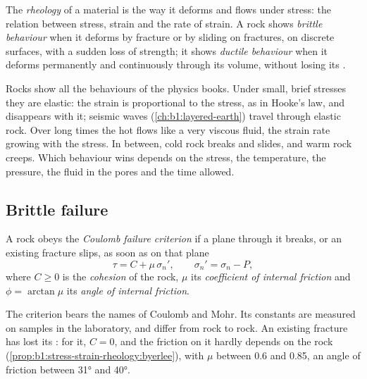 \begin{definition}\label{def:b1:stress-strain-rheology:rheology}
The \emph{rheology} of a material is the way it deforms and
flows under stress: the relation between stress, strain and the rate of
strain. A rock shows \emph{brittle behaviour} when
it deforms by fracture or by sliding on fractures, on discrete surfaces, with
a sudden loss of strength; it shows \emph{ductile behaviour} when it deforms permanently and continuously through its volume,
without losing its .
\end{definition}

Rocks show all the behaviours of the physics books. Under small, brief
stresses they are elastic: the strain is proportional to the stress, as in
Hooke's law, and disappears with it; seismic waves
(\cref{ch:b1:layered-earth}) travel through elastic rock. Over long times the
hot  flows like a very viscous fluid, the strain rate growing with the
stress. In between, cold rock breaks and slides, and warm rock creeps. Which
behaviour wins depends on the stress, the temperature, the pressure, the fluid
in the pores and the time allowed.

\subsection*{Brittle failure}

\begin{definition}\label{def:b1:stress-strain-rheology:coulomb}
A rock obeys the \emph{Coulomb failure criterion} if a plane through it breaks, or an existing fracture slips, as
soon as on that plane
\[
  \tau = C + \mu\,\sigma_n' , \qquad \sigma_n' = \sigma_n - P ,
\]
where $C \ge 0$ is the \emph{cohesion} of the rock,
$\mu$ its \emph{coefficient of internal friction} and $\phi = \arctan\mu$ its \emph{angle of internal
friction}.
\end{definition}

The criterion bears the names of Coulomb and Mohr. Its constants are measured
on samples in the laboratory, and differ from rock to rock. An existing
fracture has lost its : for it, $C = 0$, and the friction on it
hardly depends on the rock (\cref{prop:b1:stress-strain-rheology:byerlee}),
with $\mu$ between 0.6 and 0.85, an angle of friction between \ang{31} and
\ang{40}.

